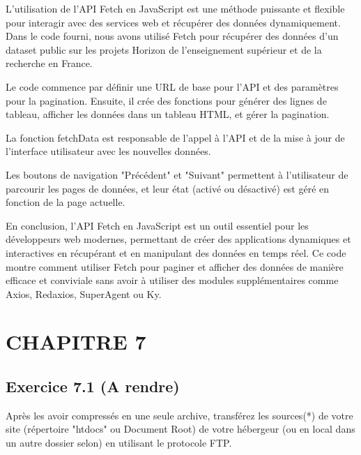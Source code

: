 \documentclass[a4paper,11pt]{article}
\begin{document}
            \newpage
            \begin{tcolorbox}[colback=lightgray!6, colframe=black, left=5mm, right=5mm, top=2mm, bottom=2mm, boxrule=0.1mm]
                L'utilisation de l'API Fetch en JavaScript est une méthode puissante et flexible pour interagir avec des services web et récupérer des données dynamiquement. \\ Dans le code fourni, nous avons utilisé Fetch pour récupérer des données d'un dataset public sur les projets Horizon de l'enseignement supérieur et de la recherche en France.

                \bigskip
                Le code commence par définir une URL de base pour l'API et des paramètres pour la pagination. Ensuite, il crée des fonctions pour générer des lignes de tableau, afficher les données dans un tableau HTML, et gérer la pagination. 
                
                \bigskip
                La fonction fetchData est responsable de l'appel à l'API et de la mise à jour de l'interface utilisateur avec les nouvelles données.
                
                \bigskip
                Les boutons de navigation "Précédent" et "Suivant" permettent à l'utilisateur de parcourir les pages de données, et leur état (activé ou désactivé) est géré en fonction de la page actuelle.
                
                \bigskip
                En conclusion, l'API Fetch en JavaScript est un outil essentiel pour les développeurs web modernes, permettant de créer des applications dynamiques et interactives en récupérant et en manipulant des données en temps réel. Ce code montre comment utiliser Fetch pour paginer et afficher des données de manière efficace et conviviale sans avoir à utiliser 
                des modules supplémentaires comme Axios, Redaxios, SuperAgent ou Ky. 
            \end{tcolorbox}

    \newpage
    \section{CHAPITRE 7}
        \subsection{Exercice 7.1 (A rendre)}
            \noindent Après les avoir compressés en une seule archive, transférez les sources(*) de votre site (répertoire "htdocs" ou Document
            Root) de votre hébergeur (ou en local dans un autre dossier selon)
            en utilisant le protocole FTP.
\end{document}
